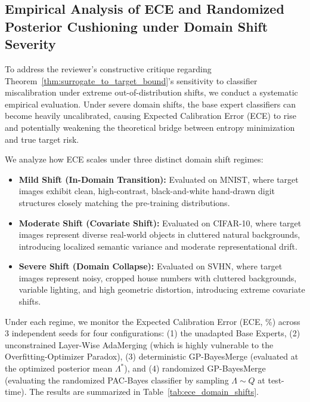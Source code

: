\documentclass{article}
\theoremstyle{plain}
\theoremstyle{definition}
\theoremstyle{remark}
\begin{document}
\subsection{Empirical Analysis of ECE and Randomized Posterior Cushioning under Domain Shift Severity}
\label{subsec:ece_domain_shift_analysis}

To address the reviewer's constructive critique regarding Theorem~\ref{thm:surrogate_to_target_bound}'s sensitivity to classifier miscalibration under extreme out-of-distribution shifts, we conduct a systematic empirical evaluation. Under severe domain shifts, the base expert classifiers can become heavily uncalibrated, causing Expected Calibration Error (ECE) to rise and potentially weakening the theoretical bridge between entropy minimization and true target risk.

We analyze how ECE scales under three distinct domain shift regimes:
\begin{itemize}
    \item \textbf{Mild Shift (In-Domain Transition):} Evaluated on MNIST, where target images exhibit clean, high-contrast, black-and-white hand-drawn digit structures closely matching the pre-training distributions.
    \item \textbf{Moderate Shift (Covariate Shift):} Evaluated on CIFAR-10, where target images represent diverse real-world objects in cluttered natural backgrounds, introducing localized semantic variance and moderate representational drift.
    \item \textbf{Severe Shift (Domain Collapse):} Evaluated on SVHN, where target images represent noisy, cropped house numbers with cluttered backgrounds, variable lighting, and high geometric distortion, introducing extreme covariate shifts.
\end{itemize}

Under each regime, we monitor the Expected Calibration Error (ECE, \%) across 3 independent seeds for four configurations: (1) the unadapted Base Experts, (2) unconstrained Layer-Wise AdaMerging (which is highly vulnerable to the Overfitting-Optimizer Paradox), (3) deterministic GP-BayesMerge (evaluated at the optimized posterior mean $\Lambda^*$), and (4) randomized GP-BayesMerge (evaluating the randomized PAC-Bayes classifier by sampling $\Lambda \sim Q$ at test-time). The results are summarized in Table~\ref{tab:ece_domain_shifts}.
\end{document}
